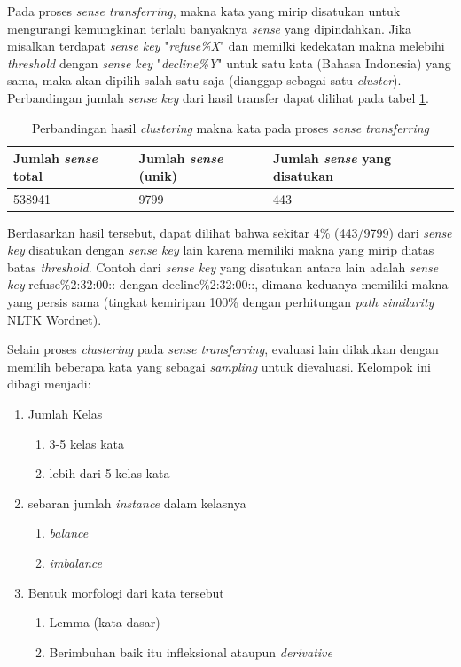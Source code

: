 Pada proses \textit{sense transferring}, makna kata yang mirip disatukan untuk mengurangi kemungkinan terlalu banyaknya \textit{sense} yang dipindahkan. Jika misalkan terdapat \textit{sense key} "\textit{refuse\%X}" dan memilki kedekatan makna melebihi \textit{threshold} dengan \textit{sense key} "\textit{decline\%Y}" untuk satu kata (Bahasa Indonesia) yang sama, maka akan dipilih salah satu saja (dianggap sebagai satu \textit{cluster}). Perbandingan jumlah \textit{sense key} dari hasil transfer dapat dilihat pada tabel \ref{table:sense-transfer-clustering}.

\begin{table}
	\centering
	\caption{Perbandingan hasil \textit{clustering} makna kata pada proses \textit{sense transferring}}
	\label{table:sense-transfer-clustering}
	\begin{tabular}{|p{4cm}|p{4cm}|p{4cm}|}
		\hline
		Jumlah \textit{sense} total & Jumlah \textit{sense} (unik) & Jumlah \textit{sense} yang disatukan
		\\ \hline
		538941 & 9799 & 443 \\ \hline
	\end{tabular}
\end{table}

Berdasarkan hasil tersebut, dapat dilihat bahwa sekitar 4\% (443/9799) dari \textit{sense key} disatukan dengan \textit{sense key} lain karena memiliki makna yang mirip diatas batas \textit{threshold}. Contoh dari \textit{sense key} yang disatukan antara lain adalah \textit{sense key} refuse\%2:32:00:: dengan decline\%2:32:00::, dimana keduanya memiliki makna yang persis sama (tingkat kemiripan 100\% dengan perhitungan \textit{path similarity} NLTK Wordnet).

Selain proses \textit{clustering} pada \textit{sense transferring}, evaluasi lain dilakukan dengan memilih beberapa kata yang sebagai \textit{sampling} untuk dievaluasi. Kelompok ini dibagi menjadi:

\begin{enumerate}
	\item Jumlah Kelas
	\begin{enumerate}
		\item 3-5 kelas kata
		\item lebih dari 5 kelas kata
	\end{enumerate}
	\item sebaran jumlah \textit{instance} dalam kelasnya
	\begin{enumerate}
		\item \textit{balance}
		\item \textit{imbalance}
	\end{enumerate}
	\item Bentuk morfologi dari kata tersebut
	\begin{enumerate}
		\item Lemma (kata dasar)
		\item Berimbuhan baik itu infleksional ataupun \textit{derivative}
	\end{enumerate}
\end{enumerate}

